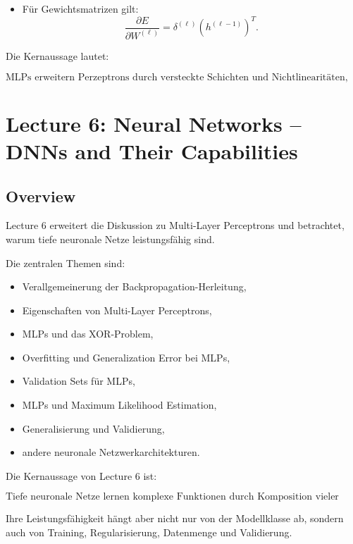 \documentclass[11pt,a4paper]{scrartcl}
\begin{document}
\begin{answerbox}
\begin{itemize}
        \item Für Gewichtsmatrizen gilt:
        \[
            \frac{\partial E}{\partial W^{(\ell)}}
            =
            \delta^{(\ell)}
            \left(h^{(\ell-1)}\right)^T.
        \]
    \end{itemize}

    Die Kernaussage lautet:

    \[
        \boxed{
            \text{MLPs erweitern Perzeptrons durch versteckte Schichten und
            Nichtlinearitäten, sodass komplexe Funktionen gelernt werden können.}
        }
    \]
\end{answerbox}

\section{Lecture 6: Neural Networks -- DNNs and Their Capabilities}

\subsection{Overview}

\begin{notebox}
    Lecture 6 erweitert die Diskussion zu Multi-Layer Perceptrons und betrachtet,
    warum tiefe neuronale Netze leistungsfähig sind.

    Die zentralen Themen sind:

    \begin{itemize}
        \item Verallgemeinerung der Backpropagation-Herleitung,
        \item Eigenschaften von Multi-Layer Perceptrons,
        \item MLPs und das XOR-Problem,
        \item Overfitting und Generalization Error bei MLPs,
        \item Validation Sets für MLPs,
        \item MLPs und Maximum Likelihood Estimation,
        \item Generalisierung und Validierung,
        \item andere neuronale Netzwerkarchitekturen.
    \end{itemize}
\end{notebox}

\begin{answerbox}
    Die Kernaussage von Lecture 6 ist:

    \[
        \boxed{
            \text{Tiefe neuronale Netze lernen komplexe Funktionen durch
            Komposition vieler einfacher nichtlinearer Transformationen.}
        }
    \]

    Ihre Leistungsfähigkeit hängt aber nicht nur von der Modellklasse ab,
    sondern auch von Training, Regularisierung, Datenmenge und Validierung.
\end{answerbox}
\end{document}
